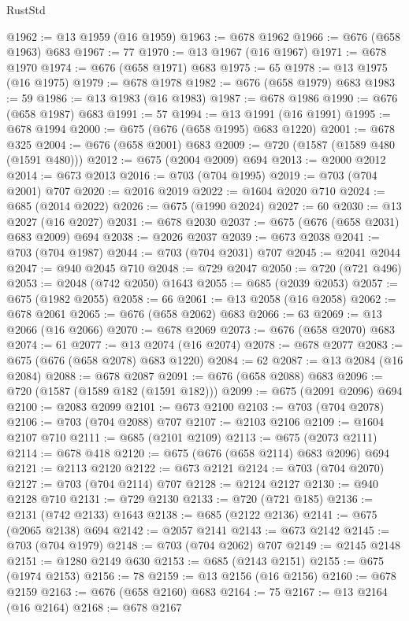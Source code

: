 \begin{lexlean}{RustStd}
\begin{coremodule}
{\begin{coremodule}
{{{{{{{{{{{{@1962 := @13 @1959 (@16 @1959)
@1963 := @678 @1962
@1966 := @676 (@658 @1963) @683
@1967 := 77
@1970 := @13 @1967 (@16 @1967)
@1971 := @678 @1970
@1974 := @676 (@658 @1971) @683
@1975 := 65
@1978 := @13 @1975 (@16 @1975)
@1979 := @678 @1978
@1982 := @676 (@658 @1979) @683
@1983 := 59
@1986 := @13 @1983 (@16 @1983)
@1987 := @678 @1986
@1990 := @676 (@658 @1987) @683
@1991 := 57
@1994 := @13 @1991 (@16 @1991)
@1995 := @678 @1994
@2000 := @675 (@676 (@658 @1995) @683 @1220)
@2001 := @678 @325
@2004 := @676 (@658 @2001) @683
@2009 := @720 (@1587 (@1589 @480 (@1591 @480)))
@2012 := @675 (@2004 @2009) @694
@2013 := @2000 @2012
@2014 := @673 @2013
@2016 := @703 (@704 @1995)
@2019 := @703 (@704 @2001) @707
@2020 := @2016 @2019
@2022 := @1604 @2020 @710
@2024 := @685 (@2014 @2022)
@2026 := @675 (@1990 @2024)
@2027 := 60
@2030 := @13 @2027 (@16 @2027)
@2031 := @678 @2030
@2037 := @675 (@676 (@658 @2031) @683 @2009) @694
@2038 := @2026 @2037
@2039 := @673 @2038
@2041 := @703 (@704 @1987)
@2044 := @703 (@704 @2031) @707
@2045 := @2041 @2044
@2047 := @940 @2045 @710
@2048 := @729 @2047
@2050 := @720 (@721 @496)
@2053 := @2048 (@742 @2050) @1643
@2055 := @685 (@2039 @2053)
@2057 := @675 (@1982 @2055)
@2058 := 66
@2061 := @13 @2058 (@16 @2058)
@2062 := @678 @2061
@2065 := @676 (@658 @2062) @683
@2066 := 63
@2069 := @13 @2066 (@16 @2066)
@2070 := @678 @2069
@2073 := @676 (@658 @2070) @683
@2074 := 61
@2077 := @13 @2074 (@16 @2074)
@2078 := @678 @2077
@2083 := @675 (@676 (@658 @2078) @683 @1220)
@2084 := 62
@2087 := @13 @2084 (@16 @2084)
@2088 := @678 @2087
@2091 := @676 (@658 @2088) @683
@2096 := @720 (@1587 (@1589 @182 (@1591 @182)))
@2099 := @675 (@2091 @2096) @694
@2100 := @2083 @2099
@2101 := @673 @2100
@2103 := @703 (@704 @2078)
@2106 := @703 (@704 @2088) @707
@2107 := @2103 @2106
@2109 := @1604 @2107 @710
@2111 := @685 (@2101 @2109)
@2113 := @675 (@2073 @2111)
@2114 := @678 @418
@2120 := @675 (@676 (@658 @2114) @683 @2096) @694
@2121 := @2113 @2120
@2122 := @673 @2121
@2124 := @703 (@704 @2070)
@2127 := @703 (@704 @2114) @707
@2128 := @2124 @2127
@2130 := @940 @2128 @710
@2131 := @729 @2130
@2133 := @720 (@721 @185)
@2136 := @2131 (@742 @2133) @1643
@2138 := @685 (@2122 @2136)
@2141 := @675 (@2065 @2138) @694
@2142 := @2057 @2141
@2143 := @673 @2142
@2145 := @703 (@704 @1979)
@2148 := @703 (@704 @2062) @707
@2149 := @2145 @2148
@2151 := @1280 @2149 @630
@2153 := @685 (@2143 @2151)
@2155 := @675 (@1974 @2153)
@2156 := 78
@2159 := @13 @2156 (@16 @2156)
@2160 := @678 @2159
@2163 := @676 (@658 @2160) @683
@2164 := 75
@2167 := @13 @2164 (@16 @2164)
@2168 := @678 @2167
}}}}}}}}}}}}
\end{coremodule}}
\end{coremodule}
\end{lexlean}
